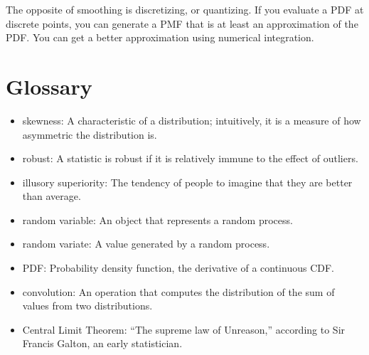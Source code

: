 \documentclass[12pt]{book}
\begin{document}
The opposite of smoothing is discretizing, or quantizing.  If you
evaluate a PDF at discrete points, you can generate a PMF that is at
least an approximation of the PDF.  You can get a better approximation
using numerical integration.




\section{Glossary}

\begin{itemize}

\item skewness: A characteristic of a distribution; intuitively, it
is a measure of how asymmetric the distribution is.

\item robust: A statistic is robust if it is relatively immune to the
  effect of outliers.

\item illusory superiority: The tendency of people to imagine that
they are better than average.

\item random variable: An object that represents a random process.

\item random variate: A value generated by a random process.

\item PDF: Probability density function, the derivative of a continuous CDF.

\item convolution: An operation that computes the distribution of the
sum of values from two distributions. 



\item Central Limit Theorem: ``The supreme law of Unreason,'' according
to Sir Francis Galton, an early statistician.

\end{itemize}
\end{document}
